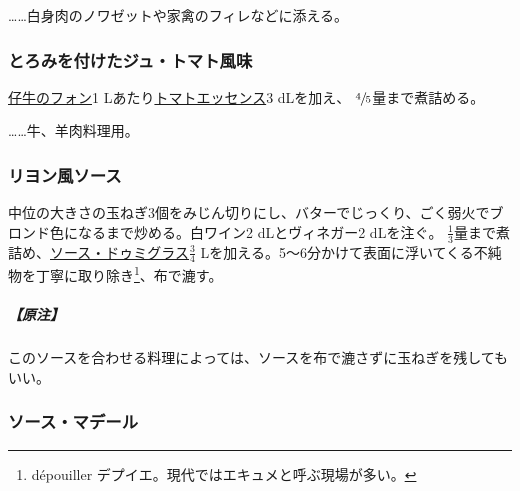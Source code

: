 \begin{recette}
\ldots{}\ldots{}白身肉のノワゼットや家禽のフィレなどに添える。

\hypertarget{jus-lie-tomate}{%
\subsubsection{とろみを付けたジュ・トマト風味}\label{jus-lie-tomate}}



\protect\hyperlink{jus-de-veau-brun}{仔牛のフォン}1
Lあたり\protect\hyperlink{essence-de-tomate}{トマトエッセンス}3
dLを加え、 \(\sfrac{4}{5}\)量まで煮詰める。

\ldots{}\ldots{}牛、羊肉料理用。

\hypertarget{sauce-lyonnaise}{%
\subsubsection{リヨン風ソース}\label{sauce-lyonnaise}}



中位の大きさの玉ねぎ3個をみじん切りにし、バターでじっくり、ごく弱火でブロンド色になるまで炒める。白ワイン2
dLとヴィネガー2 dLを注ぐ。
\(\frac{1}{3}\)量まで煮詰め、\protect\hyperlink{sauce-demi-glace}{ソース・ドゥミグラス}\(\frac{3}{4}\)
Lを加える。5〜6分かけて表面に浮いてくる不純物を丁寧に取り除き\footnote{dépouiller
  デプイエ。現代ではエキュメと呼ぶ現場が多い。}、布で漉す。

\hypertarget{nota-sauce-lyonnaise}{%
\subparagraph{【原注】}\label{nota-sauce-lyonnaise}}

このソースを合わせる料理によっては、ソースを布で漉さずに玉ねぎを残してもいい。

\hypertarget{sauce-madere}{%
\subsubsection{ソース・マデール}\label{sauce-madere}}


\end{recette}
